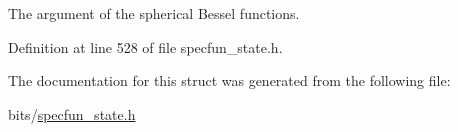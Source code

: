 The argument of the spherical Bessel functions. 



Definition at line 528 of file specfun\+\_\+state.\+h.



The documentation for this struct was generated from the following file\+:\begin{DoxyCompactItemize}
\item 
bits/\hyperlink{specfun__state_8h}{specfun\+\_\+state.\+h}\end{DoxyCompactItemize}
